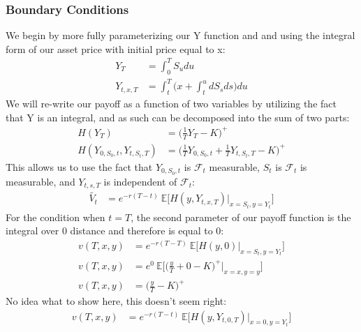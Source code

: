 \documentclass[a4paper,12pt]{article}
\begin{document}
\subsubsection{Boundary Conditions}
We begin by more fully parameterizing our Y function and and using the integral form of our asset price with initial price equal to x:
\begin{align*}
Y_{T} &= \int_0^T S_udu \\
Y_{t, x, T} &= \int_t^T \bigg(x +  \int_t^u dS_s ds \bigg) du
\end{align*}
We will re-write our payoff as a function of two variables by utilizing the fact that Y is an integral, and as such can be decomposed into the sum of two parts:
\begin{align*}
H(Y_T) &= \bigg( \frac{1}{T}Y_T - K \bigg)^+ \\
H(Y_{0, S_0, t}, Y_{t, S_t, T}) &= \bigg( \frac{1}{T}Y_{0,S_0,t} +  \frac{1}{T}Y_{t, S_t, T} - K \bigg)^+
\end{align*}
This allows us to use the fact that $Y_{0, S_0, t}$ is $\mathcal{F}_t$ measurable, $S_t$ is $\mathcal{F}_t$ is measurable, and $Y_{t, s, T}$ is independent of $\mathcal{F}_t$:
\begin{align*}
\tilde{V_t} &= e^{-r(T-t)} \ \mathbb{E} \big[ H (y, Y_{t, x, T}) | _{x = S_t, y = Y_t} \big]
\end{align*}
%
For the condition when $t = T$, the second parameter of our payoff function is the integral over 0 distance and therefore is equal to 0:
\begin{align*}
v(T, x, y) &= e^{-r(T-T)} \ \mathbb{E} \big[ H (y, 0) | _{x = S_t, y = Y_t} \big] \\
v(T, x, y) &= e^{0} \ \mathbb{E} \big[ \bigg( \frac{y}{T} +  0  - K \bigg)^+ | _{x = x, y = y} \big] \\
v(T, x, y) &=  \bigg( \frac{y}{T} - K \bigg)^+
\end{align*}
%
No idea what to show here, this doesn't seem right:
\begin{align*}
v(T, x, y) &= e^{-r(T-t)} \ \mathbb{E} \big[ H (y, Y_{t, 0, T}) | _{x = 0, y = Y_t} \big] \\
\end{align*}
\end{document}

